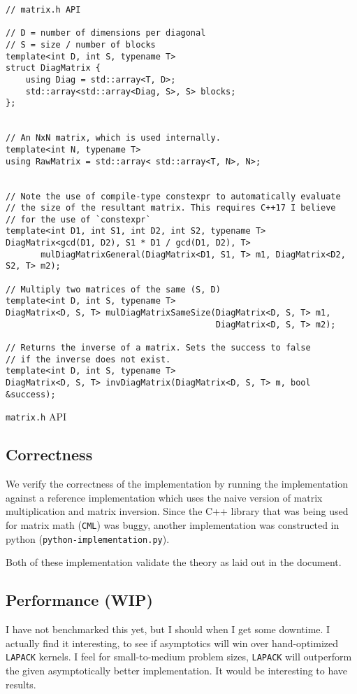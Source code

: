 \documentclass[11pt]{article}
\begin{document}
\begin{listing}
\begin{verbatim}
// matrix.h API

// D = number of dimensions per diagonal
// S = size / number of blocks
template<int D, int S, typename T>
struct DiagMatrix {
    using Diag = std::array<T, D>;
    std::array<std::array<Diag, S>, S> blocks;
};


// An NxN matrix, which is used internally.
template<int N, typename T>
using RawMatrix = std::array< std::array<T, N>, N>;


// Note the use of compile-type constexpr to automatically evaluate
// the size of the resultant matrix. This requires C++17 I believe
// for the use of `constexpr`
template<int D1, int S1, int D2, int S2, typename T>
DiagMatrix<gcd(D1, D2), S1 * D1 / gcd(D1, D2), T>
       mulDiagMatrixGeneral(DiagMatrix<D1, S1, T> m1, DiagMatrix<D2, S2, T> m2);

// Multiply two matrices of the same (S, D)
template<int D, int S, typename T>
DiagMatrix<D, S, T> mulDiagMatrixSameSize(DiagMatrix<D, S, T> m1,
                                          DiagMatrix<D, S, T> m2);

// Returns the inverse of a matrix. Sets the success to false
// if the inverse does not exist.
template<int D, int S, typename T>
DiagMatrix<D, S, T> invDiagMatrix(DiagMatrix<D, S, T> m, bool &success);
\end{verbatim}
\caption{\texttt{matrix.h} API}
\label{matrixhapi}
\end{listing}
\subsection{Correctness}
We verify the correctness of the implementation by running the implementation
against a reference implementation which uses the naive version of matrix
multiplication and matrix inversion. Since the C++ library that was being used
for matrix math ({\texttt{CML}}) was buggy, another implementation
was constructed in python (\texttt{python-implementation.py}).

Both of these implementation validate the theory as laid out in the document.

\subsection{Performance (WIP)}
I have not benchmarked this yet, but I should when I get some downtime. I
actually find it interesting, to see if asymptotics will win over hand-optimized
\texttt{LAPACK} kernels. I feel for small-to-medium problem sizes,
\texttt{LAPACK} will outperform the given asymptotically better implementation.
It would be interesting to have results.
\end{document}
